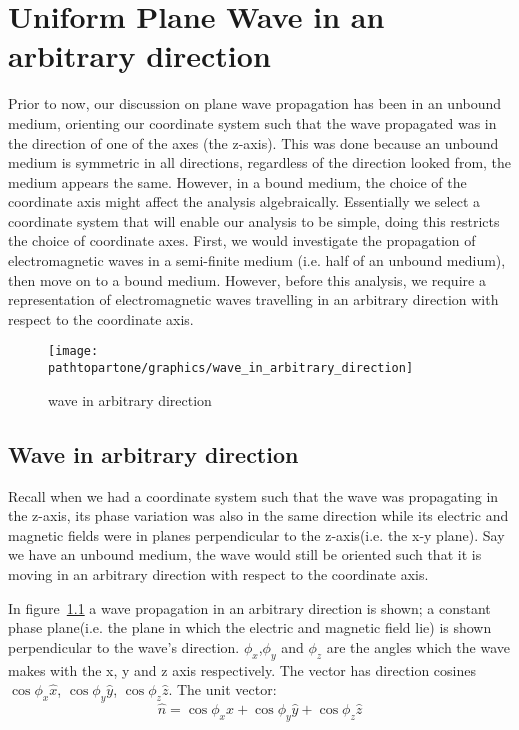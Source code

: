 \chapter{Uniform Plane Wave in an arbitrary direction}\label{lec:lec29}

Prior to now, our discussion on plane wave propagation has been in an unbound medium, orienting our coordinate system such that the wave propagated was in the direction of one of the axes (the z-axis). This was done because an unbound medium is symmetric in all directions, regardless of the direction looked from, the medium appears the same.
However, in a bound medium, the choice of the coordinate axis might affect the analysis algebraically.
Essentially we select a coordinate system that will enable our analysis to be simple, doing this restricts the choice of coordinate axes. First, we would investigate the propagation of electromagnetic waves in a semi-finite medium (i.e. half of an unbound medium), then move on to a bound medium. However, before this analysis, we require a representation of electromagnetic waves travelling in an arbitrary direction with respect to the coordinate axis.
\begin{figure}[h]
\centering
\texttt{[image: \\pathtopartone/graphics/wave\_in\_arbitrary\_direction]}
\caption{wave in arbitrary direction}
\label{fig:wave_in_arbitrary_direction}
\end{figure}

\section{Wave in arbitrary direction}
Recall when we had a coordinate system such that the wave was propagating in the z-axis, its phase variation was also in the same direction while its electric and magnetic fields were in planes perpendicular to the z-axis(i.e. the x-y plane).
Say we have an unbound medium, the wave would still be oriented such that it is moving in an arbitrary direction with respect to the coordinate axis.

In figure~\ref{fig:wave_in_arbitrary_direction} a wave propagation in an arbitrary direction is shown; a constant phase plane(i.e. the plane in which the electric and magnetic field lie) is shown perpendicular to the wave's direction.
$\phi_{x}$,$\phi_{y}$ and $\phi_{z}$ are the angles which the wave makes with the x, y and z axis respectively. 
The vector has direction cosines $\cos\phi_{x}\hat{x}$, $\cos\phi_{y}\hat{y}$, $\cos\phi_{z}\hat{z}$. The unit vector:
\begin{equation}
\hat{n} = \cos\phi_{x}\hat{x} + \cos\phi_{y}\hat{y} + \cos\phi_{z}\hat{z}
\end{equation}

